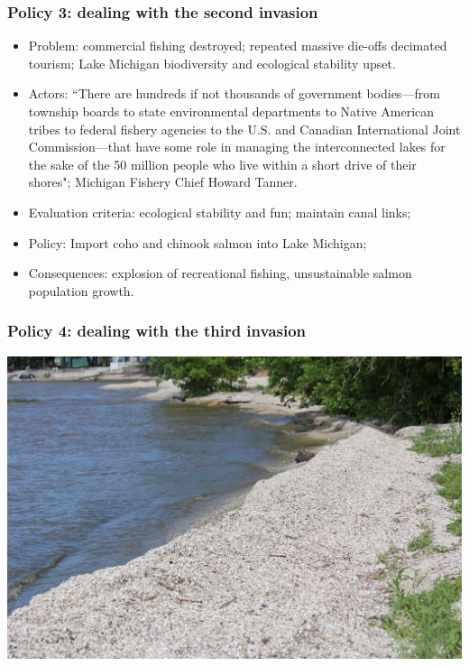 \documentclass[aspectratio=169]{beamer}
\theoremstyle{principle}
\begin{document}
\begin{frame}
\frametitle{Policy 3: dealing with the second invasion}

\begin{itemize}
\item Problem: commercial fishing destroyed; repeated massive die-offs decimated tourism; Lake Michigan biodiversity and ecological stability upset.
\bigskip
\bigskip
\item Actors: ``There are hundreds if not thousands of government bodies—from township boards to state environmental departments to Native American tribes to federal fishery agencies to the U.S. and Canadian International Joint Commission—that have some role in managing the interconnected lakes for the sake of the 50 million people who live within a short drive of their shores"; Michigan Fishery Chief Howard Tanner.
\bigskip
\bigskip
\item Evaluation criteria: ecological stability and fun; maintain canal links;
\bigskip
\bigskip
\item Policy: Import coho and chinook salmon into Lake Michigan; 
\bigskip
\bigskip
\item Consequences: explosion of recreational fishing, unsustainable salmon population growth. 
\end{itemize}

\end{frame}

\begin{frame}
\frametitle{Policy 4: dealing with the third invasion}

    \begin{center}
     \includegraphics[scale=0.15]{zebra_mussels.jpg}
     \end{center}

\end{frame}
\end{document}
